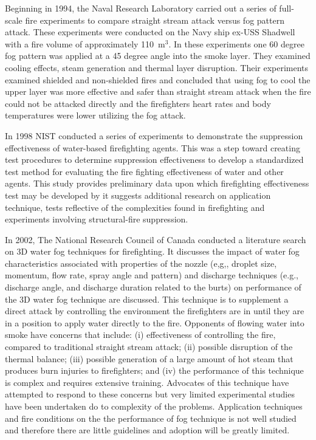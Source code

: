 \documentclass{article}
\begin{document}
Beginning in 1994, the Naval Research Laboratory carried out a series of full-scale fire experiments to compare straight stream attack versus fog pattern attack. These experiments were conducted on the Navy ship ex-USS Shadwell with a fire volume of approximately 110~m$^3$. In these experiments one 60 degree fog pattern was applied at a 45 degree angle into the smoke layer. They examined cooling effects, steam generation and thermal layer disruption. Their experiments examined shielded and non-shielded fires and concluded that using fog to cool the upper layer was more effective and safer than straight stream attack when the fire could not be attacked directly and the firefighters heart rates and body temperatures were lower utilizing the fog attack.

In 1998 NIST conducted a series of experiments to demonstrate the suppression effectiveness of water-based firefighting agents. This was a step toward creating test procedures to determine suppression effectiveness to develop a standardized test method for evaluating the fire fighting effectiveness of water and other agents. This study provides preliminary data upon which firefighting effectiveness test may be developed by it suggests additional research on application technique, tests reflective of the complexities found in firefighting and experiments involving structural-fire suppression.  

In 2002, The National Research Council of Canada conducted a literature search on 3D water fog techniques for firefighting. It discusses the impact of water fog characteristics associated with properties of the nozzle (e,g,, droplet size, momentum, flow rate, spray angle and pattern) and discharge techniques (e.g., discharge angle, and discharge duration related to the burts) on performance of the 3D water fog technique are discussed. This technique is to supplement a direct attack by controlling the environment the firefighters are in until they are in a position to apply water directly to the fire. Opponents of flowing water into smoke have concerns that include: (i) effectiveness of controlling the fire, compared to traditional straight stream attack; (ii) possible disruption of the thermal balance; (iii) possible generation of a large amount of hot steam that produces burn injuries to firefighters; and (iv) the performance of this technique is complex and requires extensive training. Advocates of this technique have attempted to respond to these concerns but very limited experimental studies have been undertaken do to complexity of the problems. Application techniques and fire conditions on the the performance of fog technique is not well studied and therefore there are little guidelines and adoption will be greatly limited.
\end{document}
